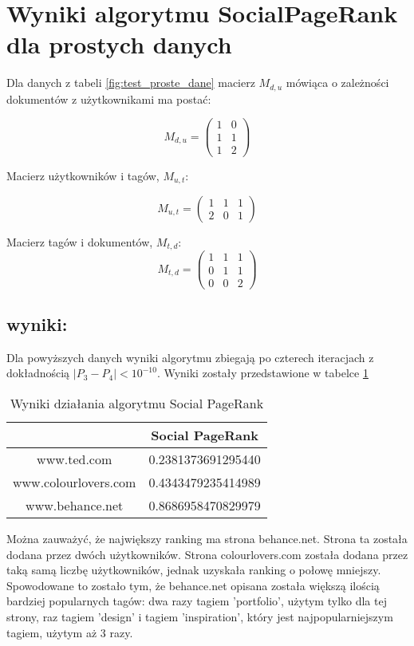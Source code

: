 \section{Wyniki algorytmu SocialPageRank dla prostych danych}


Dla danych z tabeli \ref{fig:test_proste_dane} macierz $M_{d,u}$ mówiąca o zależności dokumentów z użytkownikami ma postać:

\[
 M_{d,u} =
 \begin{pmatrix}
  1 & 0 \\
  1 & 1 \\
  1 & 2
 \end{pmatrix}
\]

Macierz użytkowników i tagów, $M_{u,t}$:

\[
 M_{u,t} =
 \begin{pmatrix}
  1 & 1 & 1 \\
  2 & 0 & 1 
 \end{pmatrix}
\]

Macierz tagów i dokumentów, $M_{t,d}$:
\[
 M_{t,d} =
 \begin{pmatrix}
  1 & 1 & 1 \\
  0 & 1 & 1 \\
  0 & 0 & 2 
 \end{pmatrix}
\]


\subsection*{wyniki:}
Dla powyższych danych wyniki algorytmu zbiegają po czterech iteracjach z dokładnością
$|P_3 - P_4|  < 10^{-10}$. Wyniki zostały przedstawione w tabelce \ref{fig:social_page_simple_wyniki}


\begin{table}[h]
  \centering
    \begin{tabular}{ | c | c | }
\hline
&Social PageRank \\
\hline
www.ted.com & 0.2381373691295440 \\
www.colourlovers.com  & 0.4343479235414989 \\
www.behance.net & 0.8686958470829979 \\
\hline
\end{tabular}
  \caption{Wyniki działania algorytmu Social PageRank}
  \label{fig:social_page_simple_wyniki}
\end{table}


Można zauważyć, że największy ranking ma strona behance.net. Strona ta została dodana przez dwóch użytkowników. Strona colourlovers.com została dodana przez taką samą liczbę użytkowników, jednak uzyskała ranking o połowę mniejszy. Spowodowane to zostało tym, że behance.net opisana została większą ilością bardziej popularnych tagów: dwa razy tagiem 'portfolio', użytym tylko dla tej strony, raz tagiem 'design' i tagiem 'inspiration', który jest najpopularniejszym tagiem, użytym aż 3 razy. 












